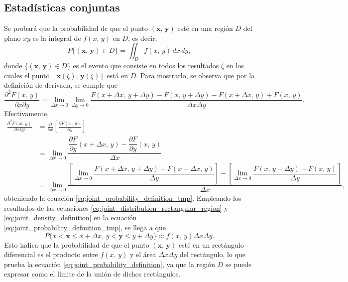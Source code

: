 \documentclass[a4paper]{report}
\newcommand{\x}{\mathbf{x}}
\newcommand{\y}{\mathbf{y}}
\begin{document}
\subsection{Estadísticas conjuntas}
Se probará que la probabilidad de que el punto \((\x,\,\y)\) esté en una región \(D\) del plano \(xy\) es la integral de \(f(x,\,y)\) en \(D\), es decir,
\begin{equation}\label{eq:joint_probability_definition}
 P\{(\x,\,\y)\in D\}=\iint_{D} f(x,\,y)\,dx\,dy,
\end{equation}
donde \(\{(\x,\,\y)\in D\}\) es el evento que consiste en todos los resultados \(\zeta\) en los cuales el punto \([\x(\zeta),\,\y(\zeta)]\) está en \(D\). Para mostrarlo, se observa que por la definición de derivada, se cumple que 
\begin{equation}\label{eq:joint_probability_definition_tmp}
 \frac{\partial^2F(x,\,y)}{\partial x\partial y}=\lim_{\Delta x\to0}\lim_{\Delta y\to0}\frac{F(x+\Delta x,\,y+\Delta y)-F(x,\,y+\Delta y)-F(x+\Delta x,\,y)+F(x,\,y)}{\Delta x\Delta y}.
\end{equation}
Efectivamente,
\begin{align*}
 \frac{\partial^2F(x,\,y)}{\partial x\partial y}&=\frac{\partial}{\partial x}\left[\frac{\partial F(x,\,y)}{\partial y}\right]\\
  &=\lim_{\Delta x\to0}\dfrac{\dfrac{\partial F}{\partial y}(x+\Delta x,\,y)-\dfrac{\partial F}{\partial y}(x,\,y)}{\Delta x}\\
  &=\lim_{\Delta x\to0}\dfrac{\left[\lim\limits_{\Delta x\to0}\dfrac{F(x+\Delta x,\,y+\Delta y)-F(x+\Delta x,\,y)}{\Delta y}\right]-\left[\lim\limits_{\Delta x\to0}\dfrac{F(x,\,y+\Delta y)-F(x,\,y)}{\Delta y}\right]}{\Delta x},
\end{align*}
obteniendo la ecuación \ref{eq:joint_probability_definition_tmp}. Empleando los resultados de las ecuaciones \ref{eq:joint_distribution_rectangular_region} y \ref{eq:joint_density_definition} en la ecuación \ref{eq:joint_probability_definition_tmp}, se llega a que
\begin{equation}\label{eq:joint_probability_interval_approximation}
 P\{x<\x\leq x+\Delta x,\,y<\y\leq y+\Delta y\}\approx f(x,\,y)\Delta x\Delta y.
\end{equation}
Esto indica que la probabilidad de que el punto \((\x,\,\y)\) esté en un rectángulo diferencial es el producto entre \(f(x,\,y)\) y el área \(\Delta x\Delta y\) del rectángulo, lo que prueba la ecuación \ref{eq:joint_probability_definition}, ya que la región \(D\) se puede expresar como el límite de la unión de dichos rectángulos.
\end{document}
